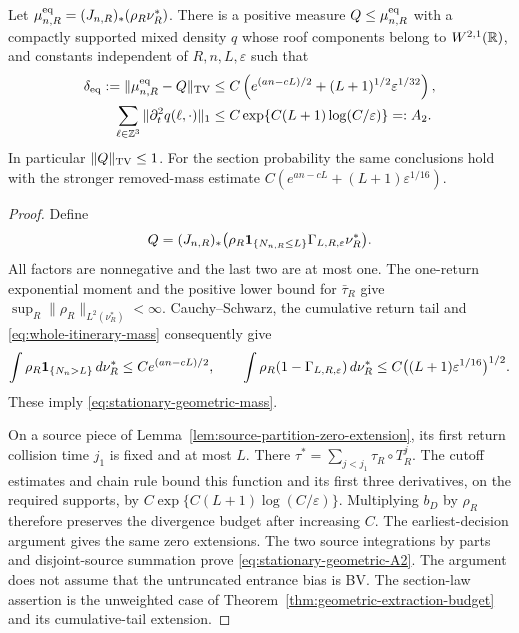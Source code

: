 \begin{proposition}
\label{prop:stationary-geometric-extraction}
Let $\mu_{n,R}^{\rm eq}=(J_{n,R})_*(\rho_R\nu_R^*)$.
There is a positive measure $Q\le\mu_{n,R}^{\rm eq}$ with a
compactly supported mixed density $q$ whose roof components belong to
$W^{2,1}(\mathbb R)$, and constants independent of $R,n,L,\varepsilon$ such that
\begin{align}
 \delta_{\rm eq}:=\|\mu_{n,R}^{\rm eq}-Q\|_{\TV}
 &\le C\left(e^{(an-cL)/2}
                +(L+1)^{1/2}\varepsilon^{1/32}\right),
                     \label{eq:stationary-geometric-mass}\\
 \sum_{\ell\in\Z^3}\|\partial_t^2q(\ell,\cdot)\|_1
 &\le C\exp\{C(L+1)\log(C/\varepsilon)\}=:A_2.
                     \label{eq:stationary-geometric-A2}
\end{align}
In particular $\|Q\|_{\operatorname{TV}}\le1$. For the section probability the same
conclusions hold with the stronger removed-mass estimate
$C(e^{an-cL}+(L+1)\varepsilon^{1/16})$.
\end{proposition}
\begin{proof}
Define
\[
 Q=(J_{n,R})_*\bigl(\rho_R\mathbf1_{\{N_{n,R}\le L\}}
                         \Gamma_{L,R,\varepsilon}\nu_R^*\bigr).
\]
All factors are nonnegative and the last two are at most one. The
one-return exponential moment and the positive lower bound for
$\bar\tau_R$ give $\sup_R\|\rho_R\|_{L^2(\nu_R^*)}<\infty$.
Cauchy--Schwarz, the cumulative return tail and
\eqref{eq:whole-itinerary-mass} consequently give
\[
 \int\rho_R\mathbf1_{\{N_n>L\}}\,d\nu_R^*
       \le C e^{(an-cL)/2},\qquad
 \int\rho_R(1-\Gamma_{L,R,\varepsilon})\,d\nu_R^*
       \le C\bigl((L+1)\varepsilon^{1/16}\bigr)^{1/2}.
\]
These imply \eqref{eq:stationary-geometric-mass}.

On a source piece of Lemma~\ref{lem:source-partition-zero-extension},
its first return collision time $j_1$ is fixed and at most $L$.
There $\tau^*=\sum_{j<j_1}\tau_R\circ T_R^j$.
The cutoff estimates and chain rule bound this function and its first
three derivatives, on the required supports, by
$C\exp\{C(L+1)\log(C/\varepsilon)\}$. Multiplying $b_D$ by
$\rho_R$ therefore preserves the divergence budget after increasing
$C$. The earliest-decision argument gives the same zero extensions.
The two source integrations by parts and disjoint-source summation
prove \eqref{eq:stationary-geometric-A2}. The argument does not assume
that the untruncated entrance bias is BV. The section-law assertion
is the unweighted case of Theorem~\ref{thm:geometric-extraction-budget}
and its cumulative-tail extension.
\end{proof}
